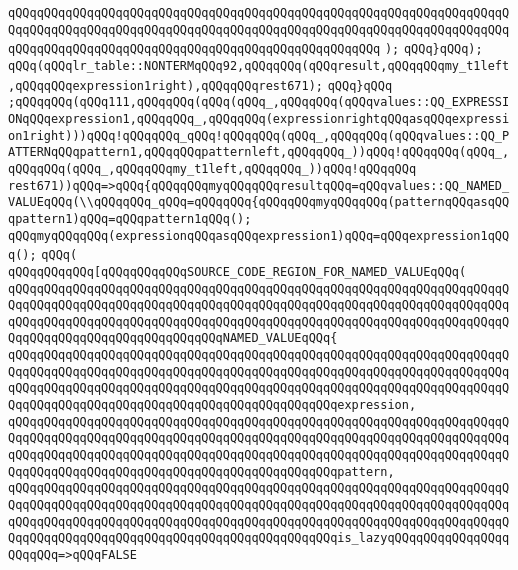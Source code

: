 \verb|qQQqqQQqqQQqqQQqqQQqqQQqqQQqqQQqqQQqqQQqqQQqqQQqqQQqqQQqqQQqqQQqqQQqqQQqqQQqqQQqqQQqqQQqqQQqqQQqqQQqqQQqqQQqqQQqqQQqqQQqqQQqqQQqqQQqqQQqqQQqqQQqqQQqqQQqqQQqqQQqqQQqqQQqqQQqqQQqqQQqqQQqqQQqqQQq|\newline
\verb|);|\newline
\verb|qQQq}qQQq);|\newline
\verb|qQQq(qQQqlr_table::NONTERMqQQq92,qQQqqQQq(qQQqresult,qQQqqQQqmy_t1left,qQQqqQQqexpression1right),qQQqqQQqrest671);|\newline
\verb|qQQq}qQQq|\newline
\verb|;qQQqqQQq(qQQq111,qQQqqQQq(qQQq(qQQq_,qQQqqQQq(qQQqvalues::QQ_EXPRESSIONqQQqexpression1,qQQqqQQq_,qQQqqQQq(expressionrightqQQqasqQQqexpression1right)))qQQq!qQQqqQQq_qQQq!qQQqqQQq(qQQq_,qQQqqQQq(qQQqvalues::QQ_PATTERNqQQqpattern1,qQQqqQQqpatternleft,qQQqqQQq_))qQQq!qQQqqQQq(qQQq_,qQQqqQQq(qQQq_,qQQqqQQqmy_t1left,qQQqqQQq_))qQQq!qQQqqQQq|\newline
\verb|rest671))qQQq=>qQQq{qQQqqQQqmyqQQqqQQqresultqQQq=qQQqvalues::QQ_NAMED_VALUEqQQq(\\qQQqqQQq_qQQq=qQQqqQQq{qQQqqQQqmyqQQqqQQq(patternqQQqasqQQqpattern1)qQQq=qQQqpattern1qQQq();|\newline
\verb|qQQqmyqQQqqQQq(expressionqQQqasqQQqexpression1)qQQq=qQQqexpression1qQQq();|\newline
\verb|qQQq(|\newline
\verb|qQQqqQQqqQQq[qQQqqQQqqQQqSOURCE_CODE_REGION_FOR_NAMED_VALUEqQQq(|\newline
\verb|qQQqqQQqqQQqqQQqqQQqqQQqqQQqqQQqqQQqqQQqqQQqqQQqqQQqqQQqqQQqqQQqqQQqqQQqqQQqqQQqqQQqqQQqqQQqqQQqqQQqqQQqqQQqqQQqqQQqqQQqqQQqqQQqqQQqqQQqqQQqqQQqqQQqqQQqqQQqqQQqqQQqqQQqqQQqqQQqqQQqqQQqqQQqqQQqqQQqqQQqqQQqqQQqqQQqqQQqqQQqqQQqqQQqqQQqqQQqqQQqNAMED_VALUEqQQq{|\newline
\verb|qQQqqQQqqQQqqQQqqQQqqQQqqQQqqQQqqQQqqQQqqQQqqQQqqQQqqQQqqQQqqQQqqQQqqQQqqQQqqQQqqQQqqQQqqQQqqQQqqQQqqQQqqQQqqQQqqQQqqQQqqQQqqQQqqQQqqQQqqQQqqQQqqQQqqQQqqQQqqQQqqQQqqQQqqQQqqQQqqQQqqQQqqQQqqQQqqQQqqQQqqQQqqQQqqQQqqQQqqQQqqQQqqQQqqQQqqQQqqQQqqQQqqQQqqQQqqQQqexpression,|\newline
\verb|qQQqqQQqqQQqqQQqqQQqqQQqqQQqqQQqqQQqqQQqqQQqqQQqqQQqqQQqqQQqqQQqqQQqqQQqqQQqqQQqqQQqqQQqqQQqqQQqqQQqqQQqqQQqqQQqqQQqqQQqqQQqqQQqqQQqqQQqqQQqqQQqqQQqqQQqqQQqqQQqqQQqqQQqqQQqqQQqqQQqqQQqqQQqqQQqqQQqqQQqqQQqqQQqqQQqqQQqqQQqqQQqqQQqqQQqqQQqqQQqqQQqqQQqqQQqqQQqpattern,|\newline
\verb|qQQqqQQqqQQqqQQqqQQqqQQqqQQqqQQqqQQqqQQqqQQqqQQqqQQqqQQqqQQqqQQqqQQqqQQqqQQqqQQqqQQqqQQqqQQqqQQqqQQqqQQqqQQqqQQqqQQqqQQqqQQqqQQqqQQqqQQqqQQqqQQqqQQqqQQqqQQqqQQqqQQqqQQqqQQqqQQqqQQqqQQqqQQqqQQqqQQqqQQqqQQqqQQqqQQqqQQqqQQqqQQqqQQqqQQqqQQqqQQqqQQqqQQqqQQqqQQqis_lazyqQQqqQQqqQQqqQQqqQQqqQQq=>qQQqFALSE|\newline
